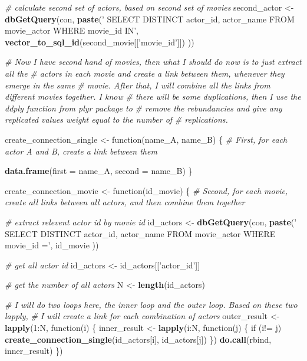 \documentclass[]{article}
\newenvironment{Shaded}{\begin{snugshade}}{\end{snugshade}}
\newcommand{\KeywordTok}[1]{\textcolor[rgb]{0.13,0.29,0.53}{\textbf{{#1}}}}
\newcommand{\DataTypeTok}[1]{\textcolor[rgb]{0.13,0.29,0.53}{{#1}}}
\newcommand{\DecValTok}[1]{\textcolor[rgb]{0.00,0.00,0.81}{{#1}}}
\newcommand{\StringTok}[1]{\textcolor[rgb]{0.31,0.60,0.02}{{#1}}}
\newcommand{\CommentTok}[1]{\textcolor[rgb]{0.56,0.35,0.01}{\textit{{#1}}}}
\newcommand{\NormalTok}[1]{{#1}}
\begin{document}
\begin{Shaded}
\begin{Highlighting}[]
\CommentTok{# calculate second set of actors, based on second set of movies}
\NormalTok{second_actor <-}
\StringTok{  }\KeywordTok{dbGetQuery}\NormalTok{(con, }\KeywordTok{paste}\NormalTok{(}\StringTok{'}
\StringTok{                        SELECT DISTINCT actor_id, actor_name}
\StringTok{                        FROM movie_actor}
\StringTok{                        WHERE movie_id IN'}\NormalTok{, }\KeywordTok{vector_to_sql_id}\NormalTok{(second_movie[[}\StringTok{'movie_id'}\NormalTok{]])}
  \NormalTok{))}

\CommentTok{# Now I have second hand of movies, then what I should do now is to just extract all the}
\CommentTok{# actors in each movie and create a link between them, whenever they emerge in the same}
\CommentTok{# movie. After that, I will combine all the links from different movies together. I know}
\CommentTok{# there will be some duplications, then I use the ddply function from plyr package to}
\CommentTok{# remove the rebundancies and give any replicated values weight equal to the number of}
\CommentTok{# replications.}

\NormalTok{create_connection_single <-}\StringTok{ }\NormalTok{function(name_A, name_B) \{}
  \CommentTok{# First, for each actor A and B, create a link between them}

  \KeywordTok{data.frame}\NormalTok{(}\DataTypeTok{first =} \NormalTok{name_A, }\DataTypeTok{second =} \NormalTok{name_B)}
\NormalTok{\}}

\NormalTok{create_connection_movie <-}\StringTok{ }\NormalTok{function(id_movie) \{}
  \CommentTok{# Second, for each movie, create all links between all actors, and then combine them together}

  \CommentTok{# extract relevent actor id by movie id}
  \NormalTok{id_actors <-}\StringTok{ }\KeywordTok{dbGetQuery}\NormalTok{(con, }\KeywordTok{paste}\NormalTok{(}\StringTok{'}
\StringTok{                                     SELECT DISTINCT actor_id, actor_name}
\StringTok{                                     FROM movie_actor}
\StringTok{                                     WHERE movie_id ='}\NormalTok{, id_movie}
  \NormalTok{))}

  \CommentTok{# get all actor id}
  \NormalTok{id_actors <-}\StringTok{ }\NormalTok{id_actors[[}\StringTok{'actor_id'}\NormalTok{]]}

  \CommentTok{# get the number of all actors}
  \NormalTok{N <-}\StringTok{ }\KeywordTok{length}\NormalTok{(id_actors)}

  \CommentTok{# I will do two loops here, the inner loop and the outer loop. Based on these two lapply,}
  \CommentTok{# I will create a link for each combination of actors}
  \NormalTok{outer_result <-}\StringTok{ }\KeywordTok{lapply}\NormalTok{(}\DecValTok{1}\NormalTok{:N, function(i) \{}
    \NormalTok{inner_result <-}\StringTok{ }\KeywordTok{lapply}\NormalTok{(i:N, function(j) \{}
      \NormalTok{if (i!=}\StringTok{ }\NormalTok{j) }\KeywordTok{create_connection_single}\NormalTok{(id_actors[i], id_actors[j])}
    \NormalTok{\})}
    \KeywordTok{do.call}\NormalTok{(rbind, inner_result)}
  \NormalTok{\})}


\end{Highlighting}
\end{Shaded}
\end{document}
